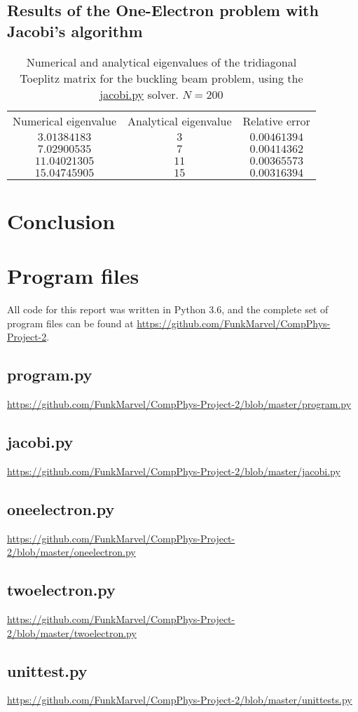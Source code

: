 \documentclass[english,notitlepage,reprint]{revtex4-1}  %
\begin{document}
\subsection{Results of the One-Electron problem with Jacobi's algorithm}
\begin{table}[H]
	\label{tab:421}
	\centering
	\begin{tabular}{|c|c|c|}
	Numerical eigenvalue & Analytical eigenvalue & Relative error \\
	\(3.01384183\)	& \(3\) & \(0.00461394\) \\
	\(7.02900535\) & \(7\) & \(0.00414362\) \\
	\(11.04021305\) & \(11\) & \(0.00365573\) \\
	\(15.04745905\) & \(15\) & \(0.00316394\) \\
	\end{tabular}
	\caption{Numerical and analytical eigenvalues of the tridiagonal Toeplitz matrix for
	the buckling beam problem, using the \hyperref[A:2]{jacobi.py} solver. \(N=200\)}
\end{table}

\section{Conclusion}\label{sec:5}

{}
\newpage
\appendix
\section{Program files} \label{A}
All code for this report was written in Python 3.6, and the complete set of program files can be found at \url{https://github.com/FunkMarvel/CompPhys-Project-2}.

\subsection{program.py}\label{A:1}
\url{https://github.com/FunkMarvel/CompPhys-Project-2/blob/master/program.py}

\subsection{jacobi.py}\label{A:2}
\url{https://github.com/FunkMarvel/CompPhys-Project-2/blob/master/jacobi.py}

\subsection{oneelectron.py} \label{A:3}
\url{https://github.com/FunkMarvel/CompPhys-Project-2/blob/master/oneelectron.py}

\subsection{twoelectron.py} \label{A:4}
\url{https://github.com/FunkMarvel/CompPhys-Project-2/blob/master/twoelectron.py}

\subsection{unittest.py}\label{A:5}
\url{https://github.com/FunkMarvel/CompPhys-Project-2/blob/master/unittests.py}
\end{document}
